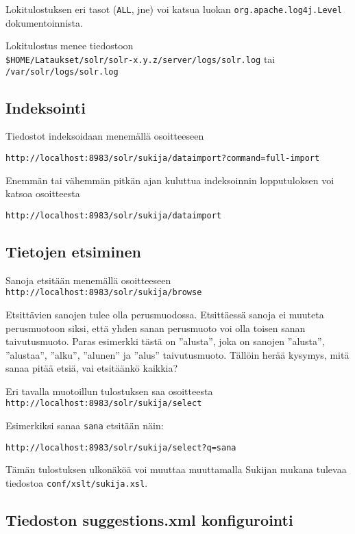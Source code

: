 \documentclass[12pt,a4paper]{scrartcl}
\begin{document}
Lokitulostuksen eri tasot (\verb=ALL=, jne) voi katsua luokan
\verb=org.apache.log4j.Level= dokumentoinnista.

Lokitulostus menee tiedostoon \\
\verb=$HOME/Lataukset/solr/solr-x.y.z/server/logs/solr.log= tai \\
\verb=/var/solr/logs/solr.log=


\subsection*{Indeksointi}

Tiedostot indeksoidaan menemällä osoitteeseen

\verb|http://localhost:8983/solr/sukija/dataimport?command=full-import|

Enemmän tai vähemmän pitkän ajan kuluttua indeksoinnin lopputuloksen
voi katsoa osoitteesta

\verb|http://localhost:8983/solr/sukija/dataimport|


\subsection*{Tietojen etsiminen}

Sanoja etsitään menemällä osoitteeseen \\
\verb=http://localhost:8983/solr/sukija/browse=

Etsittävien sanojen tulee olla perusmuodossa. Etsittäessä sanoja ei
muuteta perusmuotoon siksi, että yhden sanan perusmuoto voi olla
toisen sanan taivutusmuoto. Paras esimerkki tästä on ''alusta'', joka
on sanojen ''alusta'', ''alustaa'', ''alku'', ''alunen'' ja ''alus''
taivutusmuoto. Tällöin herää kysymys, mitä sanaa pitää etsiä, vai
etsitäänkö kaikkia?


Eri tavalla muotoillun tulostuksen saa osoitteesta \\
\verb=http://localhost:8983/solr/sukija/select=

Esimerkiksi sanaa \verb=sana= etsitään näin:

\verb|http://localhost:8983/solr/sukija/select?q=sana|

Tämän tulostuksen ulkonäköä voi muuttaa muuttamalla Sukijan mukana
tulevaa tiedostoa \verb=conf/xslt/sukija.xsl=.


\subsection*{Tiedoston suggestions.xml konfigurointi}
\end{document}

